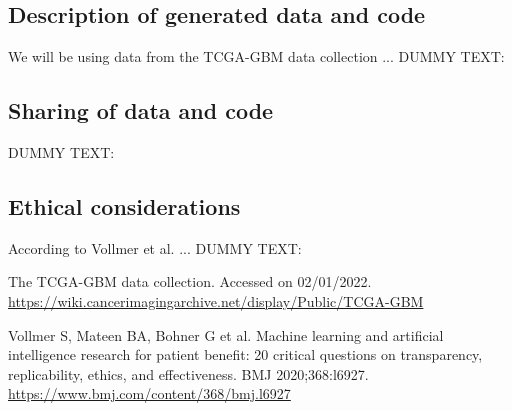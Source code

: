 \documentclass[11pt]{article}
\begin{document}
\subsection{Description of generated data and code}

We will be using data from the TCGA-GBM data collection \cite{TCGA-GBM} ...
DUMMY TEXT:
\lipsum[8]

\subsection{Sharing of data and code}

DUMMY TEXT:
\lipsum[9]

\subsection{Ethical considerations}

According to Vollmer et al. \cite{Vollmer2020} ...
DUMMY TEXT:
\lipsum[10]


\begin{footnotesize}
\begin{thebibliography}{2}

 The TCGA-GBM data collection. Accessed on 02/01/2022.\\ \scriptsize{\url{https://wiki.cancerimagingarchive.net/display/Public/TCGA-GBM}}

 Vollmer S, Mateen BA, Bohner G et al. Machine learning and artificial intelligence research for patient benefit: 20 critical questions on transparency, replicability, ethics, and effectiveness. BMJ 2020;368:l6927. \\
\scriptsize{\url{https://www.bmj.com/content/368/bmj.l6927}}


\end{thebibliography}
\end{footnotesize}
\end{document}
